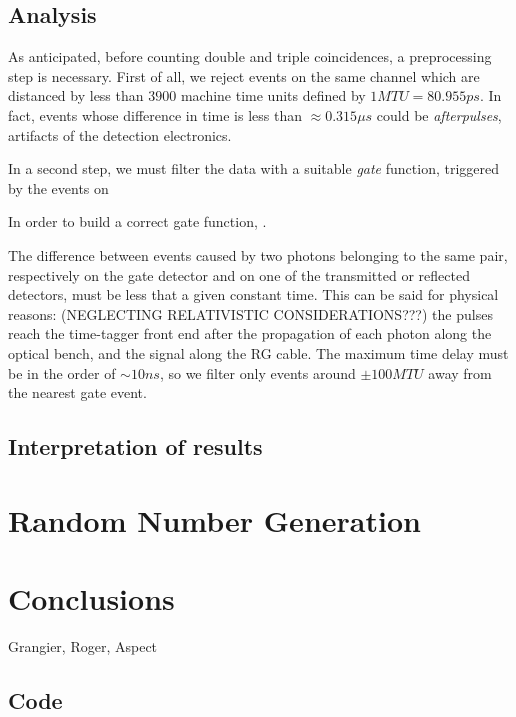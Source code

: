 \documentclass[10pt, final]{article}
\begin{document}
\begin{multicols}{2}
\subsection*{Analysis}
As anticipated, before counting double and triple coincidences, a preprocessing step is necessary. First of all, we reject events on the same channel which are distanced by less than $3900$ machine time units defined by $1 MTU = 80.955 ps$. In fact, events whose difference in time is less than $\approx 0.315 \mu s$ could be \emph{afterpulses}, artifacts of the detection electronics.

In a second step, we must filter the data with a suitable \emph{gate} function, triggered by the events on 

In order to build a correct gate function, .

The difference between events caused by two photons belonging to the same pair, respectively on the gate detector and on one of the transmitted or reflected detectors, must be less that a given constant time. This can be said for physical reasons: (NEGLECTING RELATIVISTIC CONSIDERATIONS???) the pulses reach the time-tagger front end after the propagation of each photon along the optical bench, and the signal along the RG cable. The maximum time delay must be in the order of $\sim 10 ns$, so we filter only events around $\pm 100 MTU$ away from the nearest gate event.
\subsection*{Interpretation of results}

\section{Random Number Generation}


\section*{Conclusions}


\begin{thebibliography}{99}
   Grangier, Roger, Aspect
\end{thebibliography}
\end{multicols}




\hrulefill
\subsection*{Code}
\end{document}
